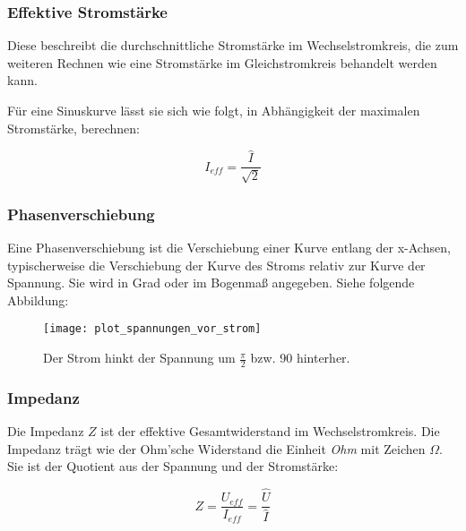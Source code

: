 \subsubsection{Effektive Stromstärke}

Diese beschreibt die durchschnittliche Stromstärke im Wechselstromkreis, die zum weiteren Rechnen wie eine Stromstärke im Gleichstromkreis behandelt werden kann.

Für eine Sinuskurve lässt sie sich wie folgt, in Abhängigkeit der maximalen Stromstärke, berechnen:

\begin{equation}	\label{eq:EffektiveStromstaerke}
	I_{eff}=\frac{\hat{I}}{\sqrt{2}}
\end{equation}


\subsubsection{Phasenverschiebung}

Eine Phasenverschiebung ist die Verschiebung einer Kurve entlang der x-Achsen, typischerweise die Verschiebung der Kurve des Stroms relativ zur Kurve der Spannung. Sie wird in Grad oder im Bogenmaß angegeben. Siehe folgende Abbildung:


\begin{figure}[H]
	\centering
	\begin{comment} Gnuplot: './xpitics.p'
set xlabel "t"
set ylabel "I, U"
set output "plot_spannungen_vor_strom.png"
plot cos(x)*0.7 title "Strom" ls 1, sin(x) title "Spannung" ls 3
	\end{comment}
	\texttt{[image: plot\_spannungen\_vor\_strom]}
	\caption{\glqq Der Strom hinkt der Spannung um $\frac{\pi}{2}$ bzw. 90\degree{} hinterher.\grqq }
\end{figure}



\subsubsection{Impedanz}

Die Impedanz $Z$ ist der effektive Gesamtwiderstand im Wechselstromkreis. Die Impedanz trägt wie der Ohm'sche Widerstand die Einheit \emph{Ohm} mit Zeichen $\Omega$. Sie ist der Quotient aus der Spannung und der Stromstärke:

\begin{equation}		\label{eq:Impedanz}
	Z = \frac{U_{eff}}{I_{eff}}
	  = \frac{\hat{U}}{\hat{I}}
\end{equation}


